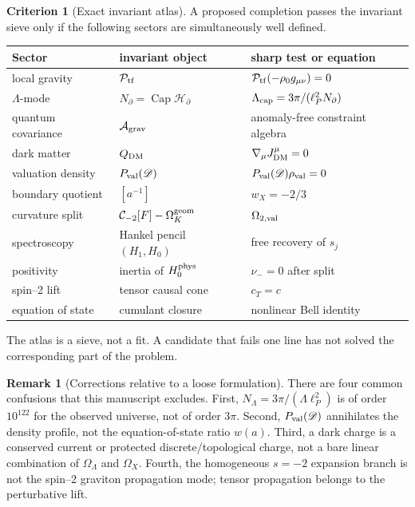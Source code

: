 \documentclass[aps,prd,reprint,nofootinbib,superscriptaddress,floatfix]{revtex4-2}
\numberwithin{equation}{section}
\theoremstyle{definition}
\newtheorem{criterion}{Criterion}[section]
\newtheorem{remark}{Remark}[section]
\theoremstyle{plain}
\newcommand{\Dil}{\mathscr D}
\newcommand{\Agrav}{\mathcal A_{\rm grav}}
\newcommand{\Ncap}{N_{\partial}}
\newcommand{\Capacity}{\operatorname{Cap}}
\newcommand{\Ptr}{\mathcal P_{\rm tf}}
\begin{document}
\begin{criterion}[Exact invariant atlas]\label{crit:atlas}
A proposed completion passes the invariant sieve only if the following sectors are simultaneously well defined.
\begin{center}
\footnotesize
\setlength{\tabcolsep}{2pt}
\begin{tabular}{@{}p{}p{}p{}@{}}
\toprule
Sector & invariant object & sharp test or equation\\
\midrule
local gravity & \(\Ptr\) & \(\Ptr(-\rho_0g_{\mu\nu})=0\)\\
\(\Lambda\)-mode & \(\Ncap=\Capacity\mathcal H_\partial\) & \(\Lambda_{\rm cap}=3\pi/(\ell_P^2\Ncap)\)\\
quantum covariance & \(\Agrav\) & anomaly-free constraint algebra\\
dark matter & \(Q_{\rm DM}\) & \(\nabla_\mu J^\mu_{\rm DM}=0\)\\
valuation density & \(P_{\rm val}(\Dil)\) & \(P_{\rm val}(\Dil)\rho_{\rm val}=0\)\\
boundary quotient & \([a^{-1}]\) & \(w_X=-2/3\)\\
curvature split & \(\mathcal C_{-2}[F]-\Omega_K^{\rm geom}\) & \(\Omega_{2,\rm val}\)\\
spectroscopy & Hankel pencil \((H_1,H_0)\) & free recovery of \(s_j\)\\
positivity & inertia of \(H_0^{\rm phys}\) & \(\nu_-=0\) after split\\
spin--2 lift & tensor causal cone & \(c_T=c\)\\
equation of state & cumulant closure & nonlinear Bell identity\\
\bottomrule
\end{tabular}
\end{center}
The atlas is a sieve, not a fit.  A candidate that fails one line has not solved the corresponding part of the problem.
\end{criterion}

\begin{remark}[Corrections relative to a loose formulation]
There are four common confusions that this manuscript excludes.  First, \(N_\Lambda=3\pi/(\Lambda\ell_P^2)\) is of order \(10^{122}\) for the observed universe, not of order \(3\pi\).  Second, \(P_{\rm val}(\Dil)\) annihilates the density profile, not the equation-of-state ratio \(w(a)\).  Third, a dark charge is a conserved current or protected discrete/topological charge, not a bare linear combination of \(\Omega_\Lambda\) and \(\Omega_X\).  Fourth, the homogeneous \(s=-2\) expansion branch is not the spin--2 graviton propagation mode; tensor propagation belongs to the perturbative lift.
\end{remark}
\end{document}

